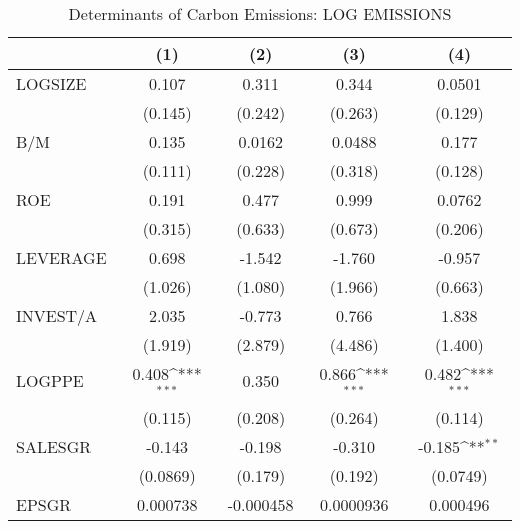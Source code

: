 \begin{table}[htbp]\centering
\def\sym#1{\ifmmode^{#1}\else\(^{#1}\)\fi}
\caption{Determinants of Carbon Emissions: LOG EMISSIONS}
\begin{tabular}{l*{4}{c}}
\hline\hline
                    &\multicolumn{1}{c}{(1)}         &\multicolumn{1}{c}{(2)}         &\multicolumn{1}{c}{(3)}         &\multicolumn{1}{c}{(4)}         \\
\hline
LOGSIZE             &       0.107         &       0.311         &       0.344         &      0.0501         \\
                    &     (0.145)         &     (0.242)         &     (0.263)         &     (0.129)         \\
B/M                 &       0.135         &      0.0162         &      0.0488         &       0.177         \\
                    &     (0.111)         &     (0.228)         &     (0.318)         &     (0.128)         \\
ROE                 &       0.191         &       0.477         &       0.999         &      0.0762         \\
                    &     (0.315)         &     (0.633)         &     (0.673)         &     (0.206)         \\
LEVERAGE            &       0.698         &      -1.542         &      -1.760         &      -0.957         \\
                    &     (1.026)         &     (1.080)         &     (1.966)         &     (0.663)         \\
INVEST/A            &       2.035         &      -0.773         &       0.766         &       1.838         \\
                    &     (1.919)         &     (2.879)         &     (4.486)         &     (1.400)         \\
LOGPPE              &       0.408\sym{***}&       0.350         &       0.866\sym{***}&       0.482\sym{***}\\
                    &     (0.115)         &     (0.208)         &     (0.264)         &     (0.114)         \\
SALESGR             &      -0.143         &      -0.198         &      -0.310         &      -0.185\sym{**} \\
                    &    (0.0869)         &     (0.179)         &     (0.192)         &    (0.0749)         \\
EPSGR               &    0.000738         &   -0.000458         &   0.0000936         &    0.000496         \\

\end{tabular}
\end{table}
